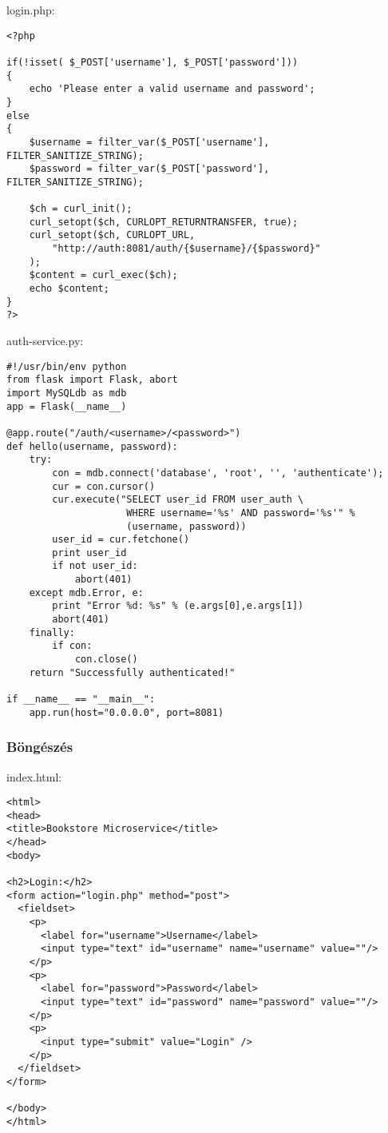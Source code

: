 login.php:

\begin{verbatim}
<?php

if(!isset( $_POST['username'], $_POST['password']))
{
    echo 'Please enter a valid username and password';
}
else
{
    $username = filter_var($_POST['username'], FILTER_SANITIZE_STRING);
    $password = filter_var($_POST['password'], FILTER_SANITIZE_STRING);

    $ch = curl_init();
    curl_setopt($ch, CURLOPT_RETURNTRANSFER, true);
    curl_setopt($ch, CURLOPT_URL,
        "http://auth:8081/auth/{$username}/{$password}"
    );
    $content = curl_exec($ch);
    echo $content;
}
?>
\end{verbatim}

auth-service.py:

\begin{verbatim}
#!/usr/bin/env python
from flask import Flask, abort
import MySQLdb as mdb
app = Flask(__name__)

@app.route("/auth/<username>/<password>")
def hello(username, password):
    try:
        con = mdb.connect('database', 'root', '', 'authenticate');
        cur = con.cursor()
        cur.execute("SELECT user_id FROM user_auth \
                     WHERE username='%s' AND password='%s'" %
                     (username, password))
        user_id = cur.fetchone()
        print user_id
        if not user_id:
            abort(401)
    except mdb.Error, e:
        print "Error %d: %s" % (e.args[0],e.args[1])
        abort(401)
    finally:
        if con:
            con.close()
    return "Successfully authenticated!"

if __name__ == "__main__":
    app.run(host="0.0.0.0", port=8081)
\end{verbatim}

\subsubsection{Böngészés}\label{buxf6nguxe9szuxe9s}

index.html:

\begin{verbatim}
<html>
<head>
<title>Bookstore Microservice</title>
</head>
<body>

<h2>Login:</h2>
<form action="login.php" method="post">
  <fieldset>
    <p>
      <label for="username">Username</label>
      <input type="text" id="username" name="username" value=""/>
    </p>
    <p>
      <label for="password">Password</label>
      <input type="text" id="password" name="password" value=""/>
    </p>
    <p>
      <input type="submit" value="Login" />
    </p>
  </fieldset>
</form>

</body>
</html>
\end{verbatim}

